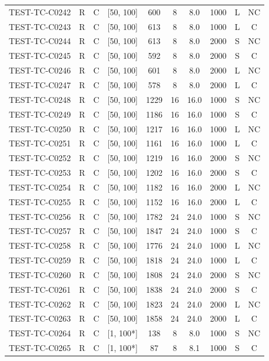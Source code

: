 \begin{longtable}{lccccccccc}
TEST-TC-C0242 & R & C & [50, 100] & 600 & 8 & 8.0 & 1000 & L & NC \\
TEST-TC-C0243 & R & C & [50, 100] & 613 & 8 & 8.0 & 1000 & L & C \\
TEST-TC-C0244 & R & C & [50, 100] & 613 & 8 & 8.0 & 2000 & S & NC \\
TEST-TC-C0245 & R & C & [50, 100] & 592 & 8 & 8.0 & 2000 & S & C \\
TEST-TC-C0246 & R & C & [50, 100] & 601 & 8 & 8.0 & 2000 & L & NC \\
TEST-TC-C0247 & R & C & [50, 100] & 578 & 8 & 8.0 & 2000 & L & C \\
TEST-TC-C0248 & R & C & [50, 100] & 1229 & 16 & 16.0 & 1000 & S & NC \\
TEST-TC-C0249 & R & C & [50, 100] & 1186 & 16 & 16.0 & 1000 & S & C \\
TEST-TC-C0250 & R & C & [50, 100] & 1217 & 16 & 16.0 & 1000 & L & NC \\
TEST-TC-C0251 & R & C & [50, 100] & 1161 & 16 & 16.0 & 1000 & L & C \\
TEST-TC-C0252 & R & C & [50, 100] & 1219 & 16 & 16.0 & 2000 & S & NC \\
TEST-TC-C0253 & R & C & [50, 100] & 1202 & 16 & 16.0 & 2000 & S & C \\
TEST-TC-C0254 & R & C & [50, 100] & 1182 & 16 & 16.0 & 2000 & L & NC \\
TEST-TC-C0255 & R & C & [50, 100] & 1152 & 16 & 16.0 & 2000 & L & C \\
TEST-TC-C0256 & R & C & [50, 100] & 1782 & 24 & 24.0 & 1000 & S & NC \\
TEST-TC-C0257 & R & C & [50, 100] & 1847 & 24 & 24.0 & 1000 & S & C \\
TEST-TC-C0258 & R & C & [50, 100] & 1776 & 24 & 24.0 & 1000 & L & NC \\
TEST-TC-C0259 & R & C & [50, 100] & 1818 & 24 & 24.0 & 1000 & L & C \\
TEST-TC-C0260 & R & C & [50, 100] & 1808 & 24 & 24.0 & 2000 & S & NC \\
TEST-TC-C0261 & R & C & [50, 100] & 1838 & 24 & 24.0 & 2000 & S & C \\
TEST-TC-C0262 & R & C & [50, 100] & 1823 & 24 & 24.0 & 2000 & L & NC \\
TEST-TC-C0263 & R & C & [50, 100] & 1858 & 24 & 24.0 & 2000 & L & C \\
TEST-TC-C0264 & R & C & [1, 100*] & 138 & 8 & 8.0 & 1000 & S & NC \\
TEST-TC-C0265 & R & C & [1, 100*] & 87 & 8 & 8.1 & 1000 & S & C \\

\end{longtable}
